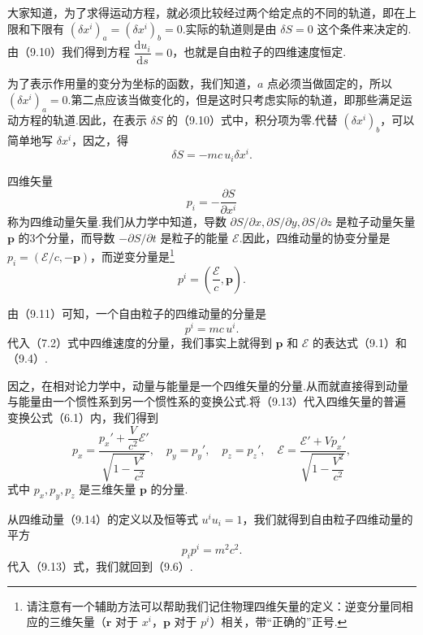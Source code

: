 大家知道，为了求得运动方程，就必须比较经过两个给定点的不同的轨道，即在上限和下限有 $(\delta x^i)_a=(\delta x^i)_b=0$.实际的轨道则是由 $\delta S=0$ 这个条件来决定的.由（9.10）我们得到方程 $\dfrac{\mathrm{d}u_i}{\mathrm{d}s}=0$，也就是自由粒子的四维速度恒定.

为了表示作用量的变分为坐标的函数，我们知道，$a$ 点必须当做固定的，所以 $(\delta x^i)_a=0$.第二点应该当做变化的，但是这时只考虑实际的轨道，即那些满足运动方程的轨道.因此，在表示 $\delta S$ 的（9.10）式中，积分项为零.代替 $(\delta x^i)_b$，可以简单地写 $\delta x^i$，因之，得
\begin{equation}
  \delta S=-mc\,u_i\delta x^i.
\end{equation}

四维矢量
\begin{equation}
  p_i=-\frac{\partial S}{\partial x^i}
\end{equation}
称为四维动量矢量.我们从力学中知道，导数 $\partial S/\partial x,\partial S/\partial y,\partial S/\partial z$ 是粒子动量矢量 $\boldsymbol{p}$ 的3个分量，而导数 $-\partial S/\partial t$ 是粒子的能量 $\mathcal{E}$.因此，四维动量的协变分量是 $p_i=(\mathcal{E}/c,-\boldsymbol{p})$，而逆变分量是\footnote{请注意有一个辅助方法可以帮助我们记住物理四维矢量的定义：逆变分量同相应的三维矢量（$\boldsymbol{r}$ 对于 $x^i$，$\boldsymbol{p}$ 对于 $p^i$）相关，带“正确的”正号.}
\begin{equation}
  p^i=\left(\frac{\mathcal{E}}{c},\boldsymbol{p}\right).
\end{equation}

由（9.11）可知，一个自由粒子的四维动量的分量是
\begin{equation}
  p^i=mc\,u^i.
\end{equation}
代入（7.2）式中四维速度的分量，我们事实上就得到 $\boldsymbol{p}$ 和 $\mathcal{E}$ 的表达式（9.1）和（9.4）.

因之，在相对论力学中，动量与能量是一个四维矢量的分量.从而就直接得到动量与能量由一个惯性系到另一个惯性系的变换公式.将（9.13）代入四维矢量的普遍变换公式（6.1）内，我们得到
\begin{equation}
  p_x=\frac{p_x'+\dfrac{V}{c^2}\mathcal{E}'}{\sqrt{1-\dfrac{V^2}{c^2}}},\quad
  p_y=p_y',\quad p_z=p_z',\quad
  \mathcal{E}=\frac{\mathcal{E}'+Vp_x'}{\sqrt{1-\dfrac{V^2}{c^2}}},
\end{equation}
式中 $p_x,p_y,p_z$ 是三维矢量 $\boldsymbol{p}$ 的分量.

从四维动量（9.14）的定义以及恒等式 $u^iu_i=1$，我们就得到自由粒子四维动量的平方
\begin{equation}
  p_ip^i=m^2c^2.
\end{equation}
代入（9.13）式，我们就回到（9.6）.


